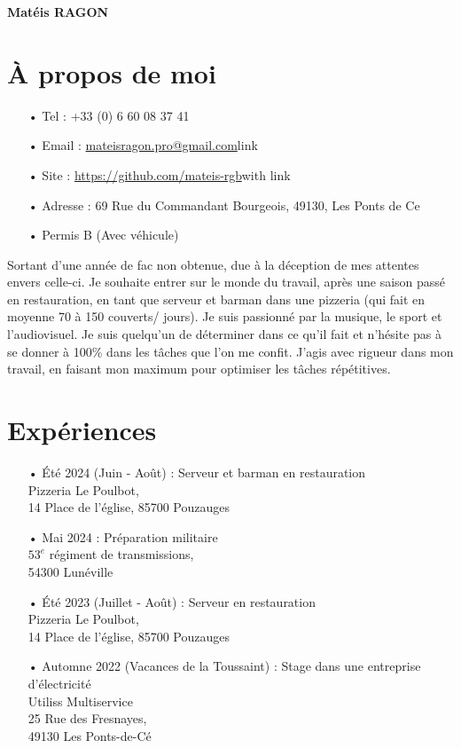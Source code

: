 \documentclass[french]{article}
\begin{document}
\RaggedRight

\begin{center}
	\Large\textbf{Matéis RAGON}\normalsize \\
\end{center}
\section*{À propos de moi}
\begin{itemize}
	\item[•] Tel : +33 (0) 6 60 08 37 41
	\item[•] Email : \href{mailto:mateisragon.pro@gmail.com}{mateisragon.pro@gmail.com}link
	\item[•] Site : \href{https://https://github.com/mateis-rgb}{https://github.com/mateis-rgb}with link
	\item[•] Adresse : 69 Rue du Commandant Bourgeois, 49130, Les Ponts de Ce
	\item[•]  Permis B (Avec véhicule)
\end{itemize}

Sortant d’une année de fac non obtenue, due à la déception de mes attentes envers celle-ci. Je souhaite entrer sur le monde du travail, après une saison passé en restauration, en tant que serveur et barman dans une pizzeria (qui fait en moyenne 70 à 150 couverts/ jours). Je suis passionné par la musique, le sport et l’audiovisuel. Je suis quelqu’un de déterminer dans ce qu’il fait et n’hésite pas à se donner à 100\% dans les tâches que l’on me confit. J’agis avec rigueur dans mon travail, en faisant mon maximum pour optimiser les tâches répétitives.

\section*{Expériences}
\begin{itemize}
	\item[• Été 2024 (Juin - Août) :] Serveur et barman en restauration \\ Pizzeria Le Poulbot, \\ 14 Place de l'église, 85700 Pouzauges

	\item[• Mai 2024 :] Préparation militaire \\ $53^{e}$ régiment de transmissions, \\ 54300 Lunéville
	
	\item[• Été 2023 (Juillet - Août) :] Serveur en restauration \\ Pizzeria Le Poulbot, \\ 14 Place de l'église, 85700 Pouzauges

	\item[• Automne 2022 (Vacances de la Toussaint) :] Stage dans une entreprise d'électricité \\ Utiliss Multiservice \\ 25 Rue des Fresnayes, \\ 49130 Les Ponts-de-Cé
\end{itemize}
\end{document}
